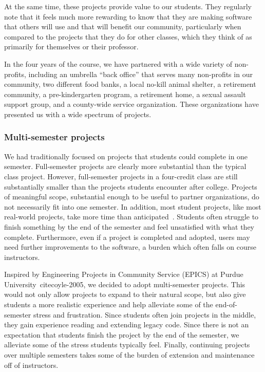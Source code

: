 At the same time, these projects provide value to our students.  They
regularly note that it feels much more rewarding to know that they are
making software that others will use and that will benefit our community,
particularly when compared to the projects that they do for other classes,
which they think of as primarily for themselves or their professor.

In the four years of the course, we have partnered with a wide
variety of non-profits, including an umbrella ``back office'' that
serves many non-profits in our community, two different food banks,
a local no-kill animal shelter, a retirement community, a
pre-kindergarten program, a retirement home, a sexual assault support
group, and a county-wide service organization.  These organizations
have presented us with a wide spectrum of projects.

\subsubsection{Multi-semester projects}

We had traditionally focused on projects that students could complete
in one semester.  Full-semester projects are clearly more substantial
than the typical class project.  However, full-semester projects
in a four-credit class are still substantially smaller than the
projects students encounter after college. 
Projects of meaningful scope, substantial enough to be useful to 
partner organizations, do not necessarily fit into one semester. 
In addition, most student projects, like most real-world projects,
take more time than anticipated~\cite{fox-2014}.  
Students often struggle to finish something by the end of the semester and 
feel unsatisfied with what they complete.
Furthermore, even if a project is completed and adopted, 
users may need further improvements to the software, a burden 
which often falls on course instructors.

Inspired by Engineering Projects in Community Service (EPICS) at 
Purdue University~cite{coyle-2005}, 
we decided to adopt multi-semester projects.
This would not only 
allow projects to expand to their natural scope, but also
give students a more realistic experience and help
alleviate some of the end-of-semester stress and frustration.  Since
students often join projects in the middle, they gain experience reading
and extending legacy code.  Since there is not an expectation that
students finish the project by the end of the semester, we alleviate
some of the stress students typically feel. Finally, continuing projects
over multiple semesters takes some of the burden of 
extension and maintenance off of instructors.

